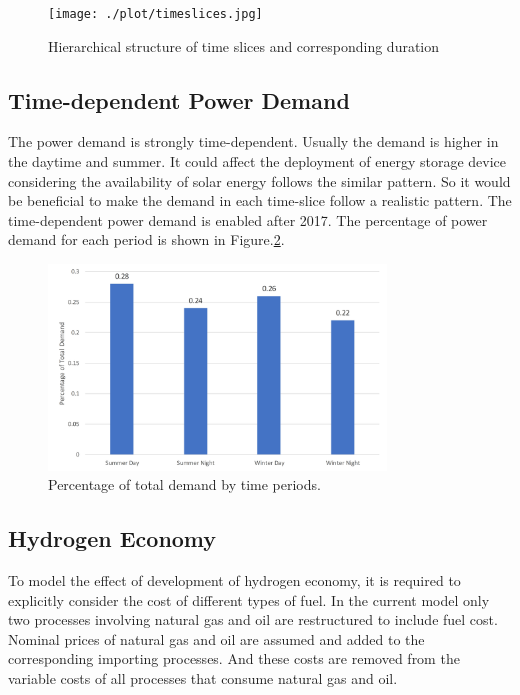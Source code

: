 \documentclass[14pt,a4paper]{article} %
\begin{document}
\begin{figure}[H]
  \centering
    \texttt{[image: ./plot/timeslices.jpg]}
  \caption{Hierarchical structure of time slices and corresponding duration }
  \label{fig:time}
\end{figure}

\subsection{Time-dependent Power Demand}
The power demand is strongly time-dependent. Usually the demand is higher in the daytime and summer. It could affect the deployment of energy storage device considering the availability of solar energy follows the similar pattern. So it would be beneficial to make the demand in each time-slice follow a realistic pattern. The time-dependent power demand is enabled after 2017. The percentage of power demand for each period is shown in Figure.\ref{fig:demand}.

\begin{figure}[H]
  \centering
    \includegraphics[width=0.8\textwidth]{./plot/demand.jpg}
  \caption{Percentage of total demand by time periods.}
  \label{fig:demand}
\end{figure}

\subsection{Hydrogen Economy}
To model the effect of development of hydrogen economy, it is required to explicitly consider the cost of different types of fuel. In the current model only two processes involving natural gas and oil are restructured to include fuel cost. Nominal prices of natural gas and oil are assumed and added to the corresponding importing processes. And these costs are removed from the variable costs of all processes that consume natural gas and oil.
\end{document}
